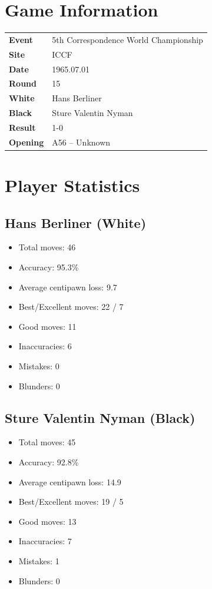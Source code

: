 \documentclass[11pt]{book}
\begin{document}
\section{Game Information}
\begin{tabular}{ll}
\textbf{Event} & 5th Correspondence World Championship \\
\textbf{Site} & ICCF \\
\textbf{Date} & 1965.07.01 \\
\textbf{Round} & 15 \\
\textbf{White} & Hans Berliner \\
\textbf{Black} & Sture Valentin Nyman \\
\textbf{Result} & 1-0 \\
\textbf{Opening} & A56 -- Unknown \\
\end{tabular}

\section{Player Statistics}

\subsection{Hans Berliner (White)}
\begin{itemize}
\item Total moves: 46
\item Accuracy: 95.3\%
\item Average centipawn loss: 9.7
\item Best/Excellent moves: 22 / 7
\item Good moves: 11
\item Inaccuracies: 6
\item Mistakes: 0
\item Blunders: 0
\end{itemize}

\subsection{Sture Valentin Nyman (Black)}
\begin{itemize}
\item Total moves: 45
\item Accuracy: 92.8\%
\item Average centipawn loss: 14.9
\item Best/Excellent moves: 19 / 5
\item Good moves: 13
\item Inaccuracies: 7
\item Mistakes: 1
\item Blunders: 0
\end{itemize}
\end{document}
